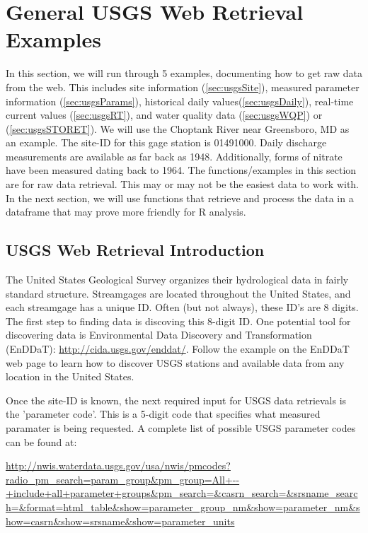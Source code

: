 \documentclass[a4paper,11pt]{article}
\begin{document}
\section{General USGS Web Retrieval Examples}
In this section, we will run through 5 examples, documenting how to get raw data from the web. This includes site information (\ref{sec:usgsSite}), measured parameter information (\ref{sec:usgsParams}), historical daily values(\ref{sec:usgsDaily}), real-time current values (\ref{sec:usgsRT}), and water quality data (\ref{sec:usgsWQP}) or (\ref{sec:usgsSTORET}). We will use the Choptank River near Greensboro, MD as an example.  The site-ID for this gage station is 01491000. Daily discharge measurements are available as far back as 1948.  Additionally, forms of nitrate have been measured dating back to 1964. The functions/examples in this section are for raw data retrieval.  This may or may not be the easiest data to work with.  In the next section, we will use functions that retrieve and process the data in a dataframe that may prove more friendly for R analysis.

\subsection{USGS Web Retrieval Introduction}
The United States Geological Survey organizes their hydrological data in fairly standard structure.  Streamgages are located throughout the United States, and each streamgage has a unique ID.  Often (but not always), these ID's are 8 digits.  The first step to finding data is discoving this 8-digit ID. One potential tool for discovering data is Environmental Data Discovery and Transformation (EnDDaT): \url{http://cida.usgs.gov/enddat/}.  Follow the example on the EnDDaT web page to learn how to discover USGS stations and available data from any location in the United States. 

Once the site-ID is known, the next required input for USGS data retrievals is the 'parameter code'.  This is a 5-digit code that specifies what measured paramater is being requested.  A complete list of possible USGS parameter codes can be found at:

\url{http://nwis.waterdata.usgs.gov/usa/nwis/pmcodes?radio_pm_search=param_group&pm_group=All+--+include+all+parameter+groups&pm_search=&casrn_search=&srsname_search=&format=html_table&show=parameter_group_nm&show=parameter_nm&show=casrn&show=srsname&show=parameter_units}
\end{document}
